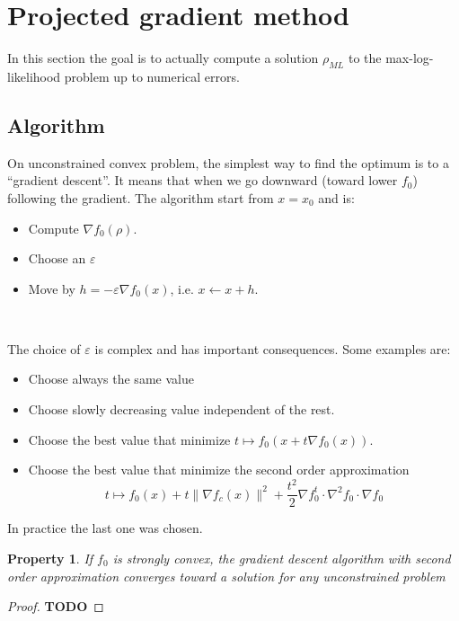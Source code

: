 \documentclass[10pt]{report}
\theoremstyle{plain}
\newtheorem{prop}[thm]{Property}
\theoremstyle{definition}
\theoremstyle{remark}
\newcommand{\TODO}{\textbf{TODO}}
\newcommand{\ml}{_{M\!L}}
\begin{document}
\section{Projected gradient method}

In this section the goal is to actually compute a solution $\rho\ml$ to the
max-log-likelihood problem up to
numerical errors.

\subsection{Algorithm}

On unconstrained convex problem, the simplest way to find the optimum is to a
``gradient descent''. It means that when we go downward (toward lower $f_0$)
following the gradient. The algorithm start from $x = x_0$ and is:

\begin{itemize}
\item Compute $\nabla f_0(\rho)$.
\item Choose an $\varepsilon$
\item Move by $h = -\varepsilon \nabla f_0(x)$, i.e. $x \leftarrow x + h$.
\end{itemize}

\

\noindent The choice of $\varepsilon$ is complex and has important consequences.
Some examples are:
\begin{itemize}
\item Choose always the same value
\item Choose slowly decreasing value independent of the rest.
\item Choose the best value that minimize $t \mapsto f_0(x + t\nabla f_0(x))$.
\item Choose the best value that minimize the second order approximation
  \[t \mapsto f_0(x) + t\|\nabla f_c(x)\|^2 + \frac {t^2} 2 \nabla f_0^t \cdot
  \nabla^2\!f_0 \cdot \nabla f_0\]
\end{itemize}

In practice the last one was chosen.
\begin{prop}
  If $f_0$ is strongly convex,
  the gradient descent algorithm with second order approximation converges
  toward a solution for any unconstrained problem
\end{prop}

\begin{proof}
  \TODO{}
\end{proof}
\end{document}
